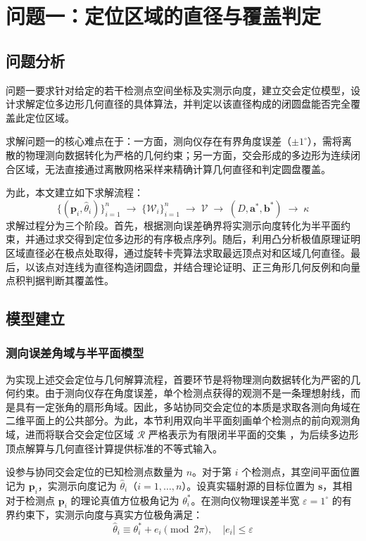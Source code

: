 \documentclass[zihao=-4,a4paper,UTF8]{ctexart}
\begin{document}
\section{问题一：定位区域的直径与覆盖判定}

\subsection{问题分析}

问题一要求针对给定的若干检测点空间坐标及实测示向度，建立交会定位模型，设计求解定位多边形几何直径的具体算法，并判定以该直径构成的闭圆盘能否完全覆盖此定位区域。

求解问题一的核心难点在于：一方面，测向仪存在有界角度误差（$\pm 1^\circ$），需将离散的物理测向数据转化为严格的几何约束；另一方面，交会形成的多边形为连续闭合区域，无法直接通过离散网格采样来精确计算几何直径和判定圆盘覆盖。

为此，本文建立如下求解流程：
\[
    \{(\mathbf{p}_i, \hat\theta_i)\}_{i=1}^n \;\longrightarrow\; \{\mathcal{W}_i\}_{i=1}^n \;\longrightarrow\; \mathcal{V} \;\longrightarrow\; (D, \mathbf{a}^*, \mathbf{b}^*) \;\longrightarrow\; \kappa
\]
求解过程分为三个阶段。首先，根据测向误差确界将实测示向度转化为半平面约束，并通过求交得到定位多边形的有序极点序列。随后，利用凸分析极值原理证明区域直径必在极点处取得，通过旋转卡壳算法求取最远顶点对和区域几何直径。最后，以该点对连线为直径构造闭圆盘，并结合理论证明、正三角形几何反例和向量点积判据判断其覆盖性。

\subsection{模型建立}

\subsubsection{测向误差角域与半平面模型}

为实现上述交会定位与几何解算流程，首要环节是将物理测向数据转化为严密的几何约束。由于测向仪存在角度误差，单个检测点获得的观测不是一条理想射线，而是具有一定张角的扇形角域。因此，多站协同交会定位的本质是求取各测向角域在二维平面上的公共部分。为此，本节利用双向半平面刻画单个检测点的前向观测角域，进而将联合交会定位区域 $\mathcal{R}$ 严格表示为有限闭半平面的交集 \cite{gholami2013}，为后续多边形顶点解算与几何直径计算提供标准的不等式输入。

设参与协同交会定位的已知检测点数量为 $n$。对于第 $i$ 个检测点，其空间平面位置记为 $\mathbf{p}_i$，实测示向度记为 $\hat\theta_i$（$i=1, \dots, n$）。设真实辐射源的目标位置为 $\mathbf{s}$，其相对于检测点 $\mathbf{p}_i$ 的理论真值方位极角记为 $\theta_i^*$。在测向仪物理误差半宽 $\varepsilon = 1^\circ$ 的有界约束下，实测示向度与真实方位极角满足：
\begin{equation}
    \hat\theta_i \equiv \theta_i^* + e_i \pmod{2\pi}, \quad |e_i| \le \varepsilon
\end{equation}
\end{document}
